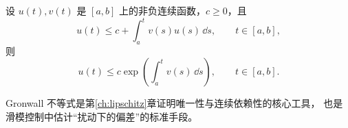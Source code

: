 \begin{lemma}\label{lem:gronwall}
设 $u(t),v(t)$ 是 $[a,b]$ 上的非负连续函数，$c\geq 0$，且
\begin{equation}
  u(t) \le c + \int_a^t v(s)u(s)\,\dd s,\qquad t\in[a,b],
\end{equation}
则
\begin{equation}
  u(t) \le c\exp\left(\int_a^t v(s)\,\dd s\right),\qquad t\in[a,b].
\end{equation}
\end{lemma}

Gronwall 不等式是第\ref{ch:lipschitz}章证明唯一性与连续依赖性的核心工具，
也是滑模控制中估计“扰动下的偏差”的标准手段。
